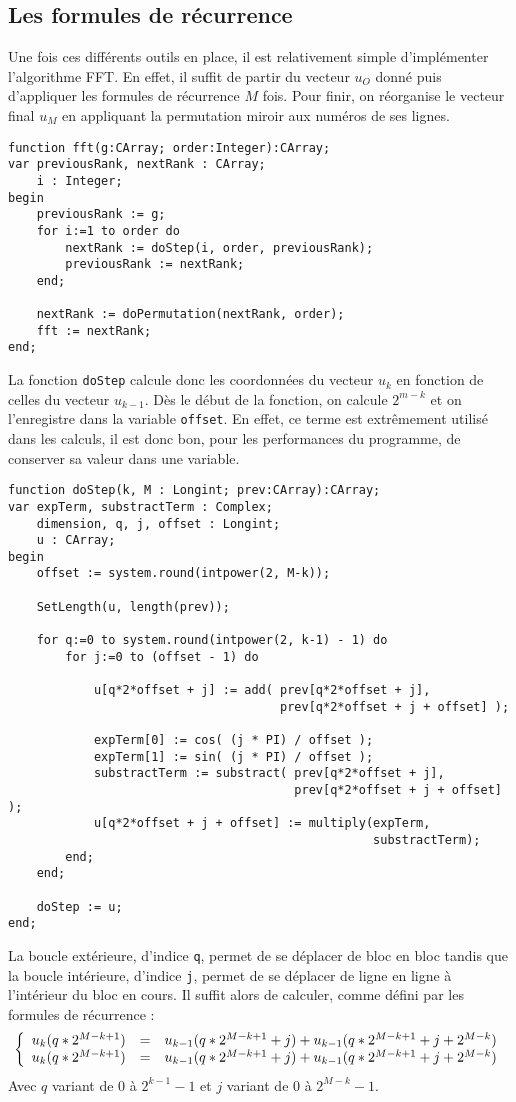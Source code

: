 \documentclass{report}
\begin{document}
	\subsection{Les formules de récurrence}
	Une fois ces différents outils en place, il est relativement simple d'implémenter l'algorithme FFT. En effet, il suffit de partir du vecteur $u_O$ donné puis d'appliquer les formules de récurrence $M$ fois. Pour finir, on réorganise le vecteur final $u_M$ en appliquant la permutation miroir aux numéros de ses lignes.
	\begin{lstlisting}
function fft(g:CArray; order:Integer):CArray;
var previousRank, nextRank : CArray;
	i : Integer;
begin
	previousRank := g;
	for i:=1 to order do
		nextRank := doStep(i, order, previousRank);
		previousRank := nextRank;
	end;

	nextRank := doPermutation(nextRank, order);
	fft := nextRank;
end;
	\end{lstlisting}
	La fonction \texttt{doStep} calcule donc les coordonnées du vecteur $u_k$ en fonction de celles du vecteur $u_{k-1}$. Dès le début de la fonction, on calcule $2^{m-k}$ et on l'enregistre dans la variable \texttt{offset}. En effet, ce terme est extrêmement utilisé dans les calculs, il est donc bon, pour les performances du programme, de conserver sa valeur dans une variable.\\
	\begin{lstlisting}
function doStep(k, M : Longint; prev:CArray):CArray;
var expTerm, substractTerm : Complex;
	dimension, q, j, offset : Longint;
	u : CArray;
begin
	offset := system.round(intpower(2, M-k));

	SetLength(u, length(prev));

	for q:=0 to system.round(intpower(2, k-1) - 1) do
		for j:=0 to (offset - 1) do

			u[q*2*offset + j] := add( prev[q*2*offset + j], 
									  prev[q*2*offset + j + offset] );

			expTerm[0] := cos( (j * PI) / offset );
			expTerm[1] := sin( (j * PI) / offset );
			substractTerm := substract( prev[q*2*offset + j], 
										prev[q*2*offset + j + offset] );
			u[q*2*offset + j + offset] := multiply(expTerm, 
												   substractTerm);
		end;
	end;

	doStep := u;
end;
	\end{lstlisting}
	La boucle extérieure, d'indice \texttt{q}, permet de se déplacer de bloc en bloc tandis que la boucle intérieure, d'indice \texttt{j}, permet de se déplacer de ligne en ligne à l'intérieur du bloc en cours. Il suffit alors de calculer, comme défini par les formules de récurrence :\\
	\[
	\left \{
	\begin{array}{r c l}
		u_k(q*2^{M-k+1}) &=& u_{k-1}(q*2^{M-k+1}+j)+u_{k-1}(q*2^{M-k+1}+j+2^{M-k})\\
		u_k(q*2^{M-k+1}) &=& u_{k-1}(q*2^{M-k+1}+j)+u_{k-1}(q*2^{M-k+1}+j+2^{M-k})\\
	\end{array}
	\right .
	\]
	Avec $q$ variant de $0$ à $2^{k-1}-1$ et $j$ variant de $0$ à $2^{M-k}-1$.
\end{document}
